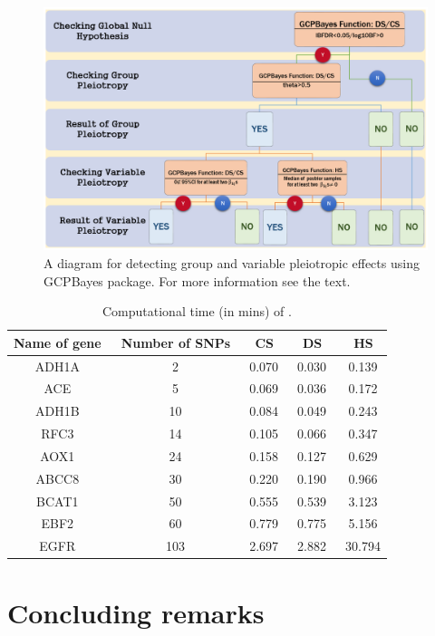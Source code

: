 \begin{figure}
\includegraphics[width=1\linewidth,height=0.3\textheight]{tree} \caption{A diagram for detecting group and variable pleiotropic effects using GCPBayes package. For more information see the text. }\label{fig:unnamed-chunk-30}
\end{figure}
\begin{table}[hbt!]
 \centering
 \footnotesize
  \caption{\label{comptime} Computational time (in mins) of . }
       \begin{tabular}{ccccc}
        \hline
Name of gene &\  Number of SNPs &\  CS &\  DS &\  HS \\\hline
ADH1A &\  2 &\  0.070 &\  0.030 &\  0.139 \\
ACE &\  5 &\  0.069 &\  0.036 &\  0.172 \\
ADH1B &\  10 &\  0.084 &\  0.049 &\  0.243 \\
RFC3 &\  14 &\  0.105 &\  0.066 &\  0.347 \\
AOX1 &\  24 &\  0.158 &\  0.127 &\  0.629 \\
ABCC8 &\  30 &\  0.220 &\  0.190 &\  0.966 \\
BCAT1 &\  50 &\  0.555 &\  0.539 &\  3.123 \\
EBF2 &\  60 &\  0.779 &\  0.775 &\  5.156 \\ 
EGFR &\  103 &\  2.697 &\  2.882 &\  30.794 \\
 \hline
  \end{tabular}
\end{table}

\hypertarget{concluding-remarks}{%
\section{Concluding remarks}\label{concluding-remarks}}

